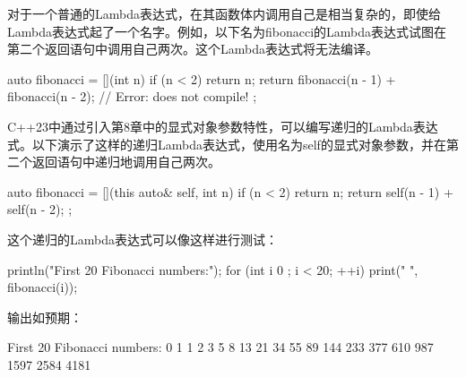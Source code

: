 



对于一个普通的Lambda表达式，在其函数体内调用自己是相当复杂的，即使给Lambda表达式起了一个名字。例如，以下名为fibonacci的Lambda表达式试图在第二个返回语句中调用自己两次。这个Lambda表达式将无法编译。

\begin{cpp}
auto fibonacci = [](int n) {
    if (n < 2) { return n; }
    return fibonacci(n - 1) + fibonacci(n - 2); // Error: does not compile!
};
\end{cpp}

C++23中通过引入第8章中的显式对象参数特性，可以编写递归的Lambda表达式。以下演示了这样的递归Lambda表达式，使用名为self的显式对象参数，并在第二个返回语句中递归地调用自己两次。

\begin{cpp}
auto fibonacci = [](this auto& self, int n) {
    if (n < 2) { return n; }
    return self(n - 1) + self(n - 2);
};
\end{cpp}

这个递归的Lambda表达式可以像这样进行测试：

\begin{cpp}
println("First 20 Fibonacci numbers:");
for (int i { 0 }; i < 20; ++i) { print("{} ", fibonacci(i)); }
\end{cpp}

输出如预期：

\begin{shell}
First 20 Fibonacci numbers:
0 1 1 2 3 5 8 13 21 34 55 89 144 233 377 610 987 1597 2584 4181
\end{shell}








